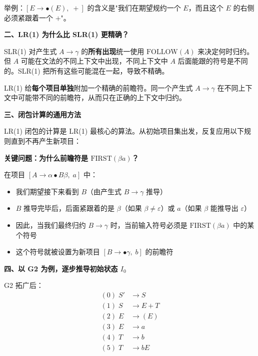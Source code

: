 \documentclass[12pt,a4paper,fontset=fandol]{ctexart}
\begin{document}
举例：$[E \to \bullet (E),\; +]$ 的含义是"我们在期望规约一个 $E$，而且这个 $E$ 的右侧必须紧跟着一个 $+$"。

\textbf{二、LR(1) 为什么比 SLR(1) 更精确？}

SLR(1) 对产生式 $A \to \gamma$ 的\textbf{所有出现}统一使用 $\text{FOLLOW}(A)$ 来决定何时归约。但 $A$ 可能在文法的不同上下文中出现，不同上下文中 $A$ 后面能跟的符号是不同的。SLR(1) 把所有这些可能混在一起，导致不精确。

LR(1) 给\textbf{每个项目单独}附加一个精确的前瞻符。同一个产生式 $A \to \gamma$ 在不同上下文中可能带不同的前瞻符，从而只在正确的上下文中归约。

\textbf{三、闭包计算的通用方法}

LR(1) 闭包的计算是 LR(1) 最核心的算法。从初始项目集出发，反复应用以下规则直到不再产生新项目：

\begin{center}
\end{center}

\textbf{关键问题：为什么前瞻符是 $\text{FIRST}(\beta a)$？}

在项目 $[A \to \alpha \bullet B \beta,\; a]$ 中：
\begin{itemize}
    \item 我们期望接下来看到 $B$（由产生式 $B \to \gamma$ 推导）
    \item $B$ 推导完毕后，后面紧跟着的是 $\beta$（如果 $\beta \neq \varepsilon$）或 $a$（如果 $\beta$ 能推导出 $\varepsilon$）
    \item 因此，当我们最终归约 $B \to \gamma$ 时，当前输入符号必须是 $\text{FIRST}(\beta a)$ 中的某个符号
    \item 这个符号就被设置为新项目 $[B \to \bullet \gamma,\; b]$ 的前瞻符
\end{itemize}

\textbf{四、以 G2 为例，逐步推导初始状态 $I_0$}

G2 拓广后：
\[
\begin{aligned}
(0)\; S' &\to S \\
(1)\; S  &\to E + T \\
(2)\; E  &\to (E) \\
(3)\; E  &\to a \\
(4)\; T  &\to b \\
(5)\; T  &\to bE
\end{aligned}
\]
\end{document}
